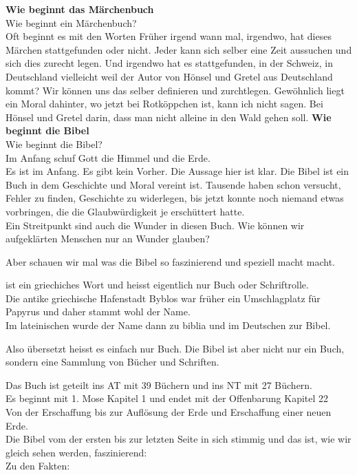 \documentclass[fontsize=16pt]{mybib}
\begin{document}
\begin{otsblock}
    \textbf{Wie beginnt das Märchenbuch}\\
    Wie beginnt ein Märchenbuch?\\
Oft beginnt es mit den Worten  Früher irgend wann mal, irgendwo, hat dieses Märchen stattgefunden oder nicht. Jeder kann sich selber eine Zeit aussuchen und sich dies zurecht legen. Und irgendwo hat es stattgefunden, in der Schweiz, in Deutschland vielleicht weil der Autor von Hönsel und Gretel aus Deutschland kommt? Wir können uns das selber definieren und zurchtlegen. Gewöhnlich liegt ein Moral dahinter, wo jetzt bei Rotköppchen ist, kann ich nicht sagen. Bei Hönsel und Gretel darin, dass man nicht alleine in den Wald gehen soll.
\textbf{Wie beginnt die Bibel}\\
Wie beginnt die Bibel?\\
Im Anfang schuf Gott die Himmel und die Erde.\\
Es ist im Anfang. Es gibt kein Vorher. Die Aussage hier ist klar. 
Die Bibel ist ein Buch in dem Geschichte und Moral vereint ist. Tausende haben schon versucht, Fehler zu finden, Geschichte zu widerlegen, bis jetzt konnte noch niemand etwas vorbringen, die die Glaubwürdigkeit je erschüttert hatte. \\
Ein Streitpunkt sind auch die Wunder in diesen Buch. Wie können wir aufgeklärten Menschen nur an Wunder glauben? 

Aber schauen wir mal was die Bibel so faszinierend und speziell macht macht.
\end{otsblock}
\begin{otsblock}
     ist ein griechiches Wort und heisst eigentlich nur Buch oder Schriftrolle.\\
    Die antike griechische Hafenstadt Byblos war früher ein Umschlagplatz für Papyrus und daher stammt wohl der Name.\\
    Im lateinischen wurde der Name dann zu biblia und im Deutschen zur Bibel. 

    Also übersetzt heisst es einfach nur Buch. Die Bibel ist aber nicht nur ein Buch, sondern eine Sammlung von Bücher und Schriften.

Das Buch ist geteilt ins AT mit 39 Büchern und ins NT mit 27 Büchern. \\
Es beginnt mit 1. Mose Kapitel 1 und endet mit der Offenbarung Kapitel 22\\
Von der Erschaffung bis zur Auflösung der Erde und Erschaffung einer neuen Erde.\\
Die Bibel vom der ersten bis zur letzten Seite in sich stimmig und das ist, wie wir gleich sehen werden, faszinierend:\\

Zu den Fakten:

\end{otsblock}
\end{document}
